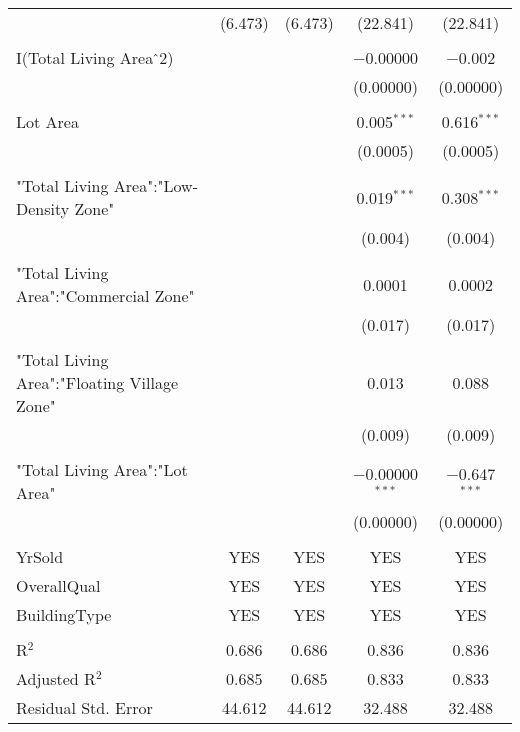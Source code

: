 \documentclass[a4paper]{article}
\begin{document}
\begin{table}[!htbp]
\begin{adjustwidth}{-0.0cm}{-0cm}
\begin{threeparttable}
\begin{tabular}{@{\extracolsep{-1pt}}lcccc}
  & (6.473) & (6.473) & (22.841) & (22.841) \\ 
  & & & & \\ 
 I(Total Living Area$\hat{\mkern6mu}$2) &  &  & $-$0.00000 & $-$0.002 \\ 
  &  &  & (0.00000) & (0.00000) \\ 
  & & & & \\ 
 Lot Area &  &  & 0.005$^{***}$ & 0.616$^{***}$ \\ 
  &  &  & (0.0005) & (0.0005) \\ 
  & & & & \\ 
 "Total Living Area":"Low-Density Zone" &  &  & 0.019$^{***}$ & 0.308$^{***}$ \\ 
  &  &  & (0.004) & (0.004) \\ 
  & & & & \\ 
 "Total Living Area":"Commercial Zone" &  &  & 0.0001 & 0.0002 \\ 
  &  &  & (0.017) & (0.017) \\ 
  & & & & \\ 
 "Total Living Area":"Floating Village Zone" &  &  & 0.013 & 0.088 \\ 
  &  &  & (0.009) & (0.009) \\ 
  & & & & \\ 
 "Total Living Area":"Lot Area" &  &  & $-$0.00000$^{***}$ & $-$0.647$^{***}$ \\ 
  &  &  & (0.00000) & (0.00000) \\ 
  & & & & \\ 
  YrSold & YES & YES & YES & YES \\ 
 OverallQual & YES & YES & YES & YES \\  
 BuildingType & YES & YES & YES & YES \\ 
\hline \\[-1.8ex] 
R$^{2}$ & 0.686 & 0.686 & 0.836 & 0.836 \\ 
Adjusted R$^{2}$ & 0.685 & 0.685 & 0.833 & 0.833 \\ 
Residual Std. Error & 44.612  & 44.612 & 32.488  & 32.488 \\ 

\end{tabular}
\end{threeparttable}
\end{adjustwidth}
\end{table}
\end{document}
